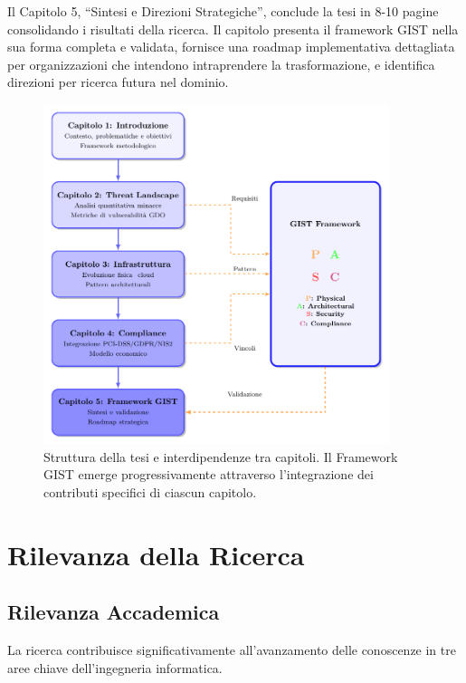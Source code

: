 \documentclass[12pt,a4paper,oneside]{book}
\numberwithin{figure}{chapter} %
\numberwithin{table}{chapter}  %
\begin{document}
Il Capitolo 5, ``Sintesi e Direzioni Strategiche'', conclude la tesi in
8-10 pagine consolidando i risultati della ricerca. Il capitolo presenta
il framework GIST nella sua forma completa e validata, fornisce una
roadmap implementativa dettagliata per organizzazioni che intendono
intraprendere la trasformazione, e identifica direzioni per ricerca
futura nel dominio.
\begin{figure}[htbp]
    \centering
    \includegraphics[width=0.9\textwidth]{figure/figura 1-4.pdf}
\caption{Struttura della tesi e interdipendenze tra capitoli. Il Framework GIST emerge progressivamente attraverso l'integrazione dei contributi specifici di ciascun capitolo.}
\label{fig:struttura_tesi}
\end{figure}

\section{\texorpdfstring{\textbf{Rilevanza della
Ricerca}}{1.8 Rilevanza della Ricerca}}\label{rilevanza-della-ricerca}

\subsection{\texorpdfstring{\textbf{Rilevanza
Accademica}}{1.8.1 Rilevanza Accademica}}\label{rilevanza-accademica}

La ricerca contribuisce significativamente all'avanzamento delle
conoscenze in tre aree chiave dell'ingegneria informatica.
\end{document}
